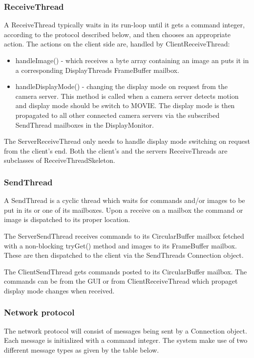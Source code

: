 \documentclass[8pt,titlepage]{article}
\begin{document}
\subsubsection{ReceiveThread}
A ReceiveThread typically waits in its run-loop until it gets a command integer, according to the protocol described below, and then chooses an appropriate action. The actions on the client side are, handled by ClientReceiveThread:
\begin{itemize}
\item handleImage() - which receives a byte array containing an image an puts it in a corresponding DisplayThreads FrameBuffer mailbox.
\item handleDisplayMode() - changing the display mode on request from the camera server. This method is called when a camera server detects motion and display mode should be switch to MOVIE. The display mode is then propagated to all other connected camera servers via the subscribed SendThread mailboxes in the DisplayMonitor.
\end{itemize}

The ServerReceiveThread only needs to handle display mode switching on request from the client’s end. Both the client’s and the servers ReceiveThreads are subclasses of ReceiveThreadSkeleton.

\subsubsection{SendThread}
A SendThread is a cyclic thread which waits for commands and/or images to be put in its or one of its mailboxes. Upon a receive on a mailbox the command or image is dispatched to its proper location. 

The ServerSendThread receives commands to its CircularBuffer mailbox fetched with a non-blocking tryGet() method and images to its FrameBuffer mailbox. These are then dispatched to the client via the SendThreads Connection object.

The ClientSendThread gets commands posted to its CircularBuffer mailbox. The commands can be from the GUI or from ClientReceiveThread which propaget display mode changes when received.

\subsubsection{Network protocol}
The network protocol will consist of messages being sent by a Connection object. Each message is initialized with a command integer. The system make use of two different message types as given by the table below. %
\end{document}
